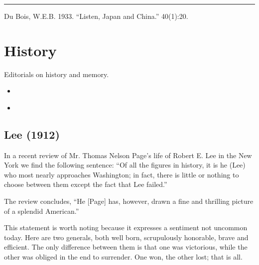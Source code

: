 \documentclass[letterpaper,10pt,english]{jupyterBook}
\begin{document}
\bigskip\hrule\bigskip


\sphinxAtStartPar
{} Du Bois, W.E.B. 1933. “Listen, Japan and China.”  40(1):20.


\section{History}
\label{\detokenize{Sections/history:history}}\label{\detokenize{Sections/history::doc}}
\sphinxAtStartPar
Editorials on history and memory.
\begin{itemize}
\item {} 
\sphinxAtStartPar
{\hyperref[\detokenize{Volumes/03/05/lee::doc}]{}}

\item {} 
\sphinxAtStartPar
{\hyperref[\detokenize{Volumes/39/01/john_brown::doc}]{}}

\end{itemize}


\subsection{Lee (1912)}
\label{\detokenize{Volumes/03/05/lee:lee-1912}}\label{\detokenize{Volumes/03/05/lee::doc}}
\sphinxAtStartPar
In a recent review of Mr. Thomas Nelson Page’s life of Robert E. Lee in the New York  we find the following sentence: “Of all the figures in history, it is he (Lee) who most nearly approaches Washington; in fact, there is little or nothing to choose between them except the fact that Lee failed.”

\begin{sphinxShadowBox}
\sphinxstylesidebartitle{}

\sphinxAtStartPar
The review concludes, “He {[}Page{]} has, however, drawn a fine and thrilling picture of a splendid American.”
\end{sphinxShadowBox}

\sphinxAtStartPar
This statement is worth noting because it expresses a sentiment not uncommon to\sphinxhyphen{}day. Here are two gen­erals, both well born, scrupulously honorable, brave and efficient. The only difference between them is that one was victorious, while the other was obliged in the end to surrender. One won, the other lost; that is all.

\begin{sphinxShadowBox}
\sphinxstylesidebartitle{}

\sphinxAtStartPar
{}
\end{sphinxShadowBox}
\end{document}
